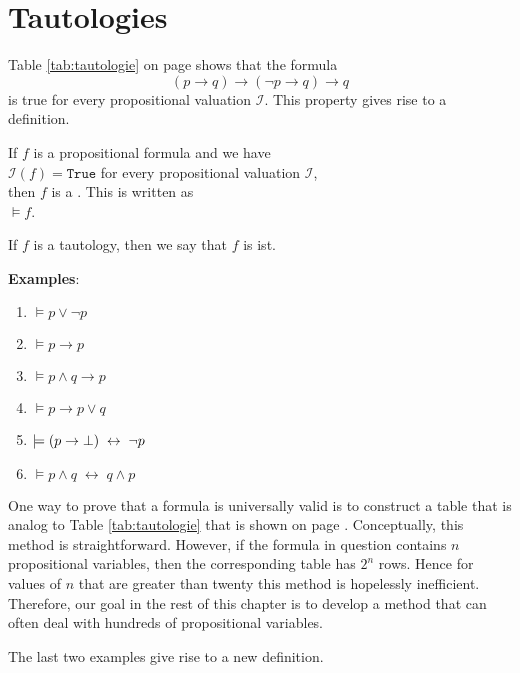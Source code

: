 \section{Tautologies}
Table \ref{tab:tautologie} on page \pageref{tab:tautologie} shows that the formula
$$  (p \rightarrow q) \rightarrow (\neg p \rightarrow q) \rightarrow q $$
is true for every propositional valuation $\mathcal{I}$.  This property gives rise to a definition.

\begin{Definition}[Tautology]
  If $f$ is a propositional formula and we have  \\[0.2cm]
  \hspace*{1.3cm} $\mathcal{I}(f) = \texttt{True}$ \quad for every propositional valuation $\mathcal{I}$, \\[0.2cm]
  then $f$ is a  .  This is written as \\[0.2cm]
  \hspace*{1.3cm} $\models f$.
  \eox
\end{Definition}

\noindent
If $f$ is a tautology, then we say that $f$ is   ist.

\noindent
\textbf{Examples}:
\begin{enumerate}
\item $\models p \vee \neg p$
\item $\models p \rightarrow p$
\item $\models p \wedge q \rightarrow p$
\item $\models p \rightarrow p \vee q$
\item $\models (p \rightarrow \bot) \;\leftrightarrow\; \neg p$
\item $\models p \wedge q \;\leftrightarrow\; q \wedge p$
\end{enumerate}
One way to prove that a formula is universally valid is to construct a table that is analog 
to Table \ref{tab:tautologie} that is shown on page \pageref{tab:tautologie}.
Conceptually, this method is straightforward.  However, if the formula in question contains $n$
propositional variables, then the corresponding table has $2^n$ rows.  Hence for values of $n$ that are greater
than twenty this method is hopelessly inefficient.  Therefore, our goal in the rest of this chapter is to develop
a method that can often deal with hundreds of propositional variables.

The last two examples give rise to a new definition.

